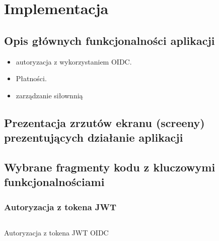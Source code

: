 \documentclass[../../spr.tex]{subfiles}
\begin{document}
\section{Implementacja}

\subsection{Opis głównych funkcjonalności aplikacji}

\begin{itemize}
  \item autoryzacja z wykorzystaniem OIDC.
  \item Płatności.
  \item zarządzanie siłownnią
\end{itemize}

\subsection{Prezentacja zrzutów ekranu (screeny) prezentujących działanie aplikacji}

\subsection{Wybrane fragmenty kodu z kluczowymi funkcjonalnościami}


\subsubsection{Autoryzacja z tokena JWT}

\begin{listing}
  \inputminted[breaklines, fontsize=\footnotesize, breakanywhere, firstline=18, numbers=left]
  {java}{./sections/implementacja/GymJwtAuthenticationConverter.java}
  \caption{Autoryzacja z tokena JWT OIDC}
\end{listing}

\subsubsection{}
\end{document}
